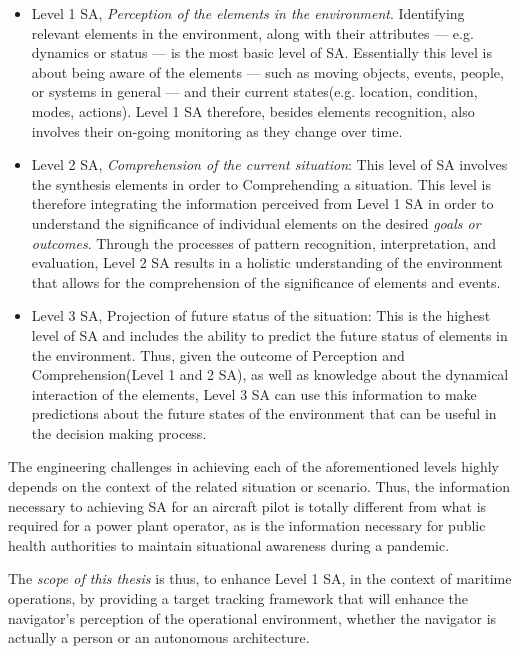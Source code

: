 \begin{itemize}
	\item Level 1 SA, \emph{Perception of the elements in the environment}. Identifying relevant elements in the environment, along with their attributes --- e.g. dynamics or status --- is the most basic level of SA. Essentially this level is about being aware of the elements --- such as moving objects, events, people, or systems in general --- and their current states(e.g. location, condition, modes, actions). Level 1 SA therefore, besides elements recognition, also involves their on-going monitoring as they change over time. 
	\item Level 2 SA, \emph{Comprehension of the current situation}: This level of SA involves the synthesis elements in order to Comprehending a situation. This level is therefore integrating the information perceived from Level 1 SA in order to understand the significance of individual elements on the desired \emph{goals or outcomes}. Through the processes of pattern recognition, interpretation, and evaluation, Level 2 SA results in a holistic understanding of the environment that allows for the comprehension of the significance of elements and events.
	\item Level 3 SA, Projection of future status of the situation: This is the highest level of SA and includes the ability to predict  the future status of elements in the environment. Thus, given the outcome of Perception and Comprehension(Level 1 and 2 SA), as well as knowledge about the dynamical interaction of the elements, Level 3 SA can use this information  to make predictions about the future states of the environment that can be useful in the decision making process.
\end{itemize}


The engineering challenges in achieving each of the aforementioned levels highly depends on the context of the related situation or scenario. Thus, the information necessary to achieving SA for an aircraft pilot is totally different from what is required for a power plant operator, as is the information necessary for public health authorities to maintain situational awareness during a pandemic. 

The \emph{scope of this thesis} is thus, to enhance Level 1 SA, in the context of maritime operations, by providing a target tracking framework that will enhance the navigator's perception of the operational environment, whether the navigator is actually a person or an autonomous architecture.

